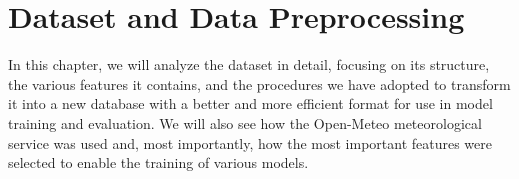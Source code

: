 \chapter{Dataset and Data Preprocessing}\label{chap:datapreprocessing}

In this chapter, we will analyze the dataset in detail, focusing on its structure, the various features it contains, and the procedures we have adopted to transform it into a new database with a better and more efficient format for use in model training and evaluation. We will also see how the Open-Meteo meteorological service was used and, most importantly, how the most important features were selected to enable the training of various models.



%


